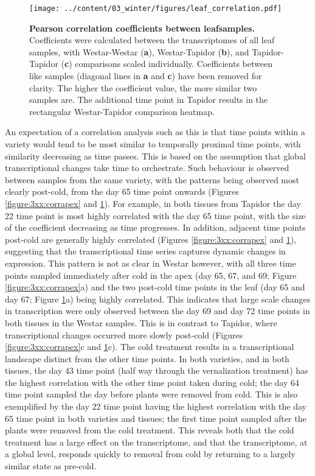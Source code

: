 \documentclass[12pt,]{book}
\begin{document}
\begin{figure}[htbp]
\centering
\texttt{[image: ../content/03\_winter/figures/leaf\_correlation.pdf]}
\caption{\textbf{Pearson correlation coefficients between leafsamples.}
Coefficients were calculated between the transcriptomes of all leaf
samples, with Westar-Westar (\textbf{a}), Westar-Tapidor (\textbf{b}),
and Tapidor-Tapidor (\textbf{c}) comparisons scaled individually.
Coefficients between like samples (diagonal lines in \textbf{a} and
\textbf{c}) have been removed for clarity. The higher the coefficient
value, the more similar two samples are. The additional time point in
Tapidor results in the rectangular Westar-Tapidor comparison
heatmap.}\label{figure:3xx:corrleaf}
\end{figure}

An expectation of a correlation analysis such as this is that time
points within a variety would tend to be most similar to temporally
proximal time points, with similarity decreasing as time passes. This is
based on the assumption that global transcriptional changes take time to
orchestrate. Such behaviour is observed between samples from the same
variety, with the patterns being observed most clearly post-cold, from
the day 65 time point onwards (Figures \ref{figure:3xx:corrapex} and
\ref{figure:3xx:corrleaf}). For example, in both tissues from Tapidor
the day 22 time point is most highly correlated with the day 65 time
point, with the size of the coefficient decreasing as time progresses.
In addition, adjacent time points post-cold are generally highly
correlated (Figures \ref{figure:3xx:corrapex} and
\ref{figure:3xx:corrleaf}), suggesting that the transcriptional time
series captures dynamic changes in expression. This pattern is not as
clear in Westar however, with all three time points sampled immediately
after cold in the apex (day 65, 67, and 69; Figure
\ref{figure:3xx:corrapex}a) and the two post-cold time points in the
leaf (day 65 and day 67; Figure \ref{figure:3xx:corrleaf}a) being highly
correlated. This indicates that large scale changes in transcription
were only observed between the day 69 and day 72 time points in both
tissues in the Westar samples. This is in contrast to Tapidor, where
transcriptional changes occurred more slowly post-cold (Figures
\ref{figure:3xx:corrapex}c and \ref{figure:3xx:corrleaf}c). The cold
treatment results in a transcriptional landscape distinct from the other
time points. In both varieties, and in both tissues, the day 43 time
point (half way through the vernalization treatment) has the highest
correlation with the other time point taken during cold; the day 64 time
point sampled the day before plants were removed from cold. This is also
exemplified by the day 22 time point having the highest correlation with
the day 65 time point in both varieties and tissues; the first time
point sampled after the plants were removed from the cold treatment.
This reveals both that the cold treatment has a large effect on the
transcriptome, and that the transcriptome, at a global level, responds
quickly to removal from cold by returning to a largely similar state as
pre-cold.
\end{document}
